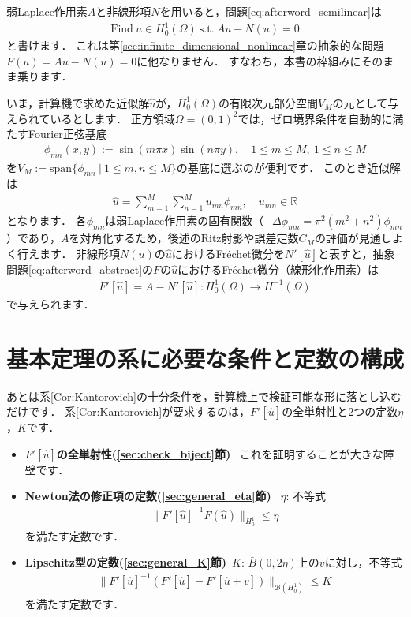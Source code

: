 弱Laplace作用素$A$と非線形項$N$を用いると，問題\eqref{eq:afterword_semilinear}は
\begin{align}
	\mbox{Find} ~ u \in H_0^1(\Omega) ~ \mbox{s.t.} ~ A u - N(u) = 0
	\label{eq:afterword_abstract}
\end{align}
と書けます．
これは第\ref{sec:infinite_dimensional_nonlinear}章の抽象的な問題$F(u) = Au - N(u) = 0$に他なりません．
すなわち，本書の枠組みにそのまま乗ります．

いま，計算機で求めた近似解$\hat{u}$が，$H_0^1(\Omega)$の有限次元部分空間$V_M$の元として与えられているとします．
正方領域$\Omega = (0,1)^2$では，ゼロ境界条件を自動的に満たすFourier正弦基底
\begin{align}
	\phi_{mn}(x, y) := \sin(m\pi x) \sin(n\pi y), \quad 1 \le m \le M,~ 1 \le n \le M
	\label{eq:afterword_basis}
\end{align}
を$V_M := \mathrm{span}\{ \phi_{mn} ~|~ 1 \le m, n \le M \}$の基底に選ぶのが便利です．
このとき近似解は
\begin{align}
	\hat{u} = \sum_{m=1}^{M} \sum_{n=1}^{M} u_{mn} \phi_{mn}, \quad u_{mn} \in \mathbb{R}
	\label{eq:afterword_uhat}
\end{align}
となります．
各$\phi_{mn}$は弱Laplace作用素の固有関数（$-\Delta \phi_{mn} = \pi^2(m^2 + n^2) \phi_{mn}$）であり，$A$を対角化するため，後述のRitz射影や誤差定数$C_M$の評価が見通しよく行えます．
非線形項$N(u)$の$\hat{u}$におけるFr\'echet微分を$N'[\hat{u}]$と表すと，抽象問題\eqref{eq:afterword_abstract}の$F$の$\hat{u}$におけるFr\'echet微分（線形化作用素）は
\begin{align}
	F'[\hat{u}] = A - N'[\hat{u}] : H_0^1(\Omega) \to H^{-1}(\Omega)
	\label{eq:afterword_L}
\end{align}
で与えられます．


\section*{基本定理の系に必要な条件と定数の構成}

あとは系\ref{Cor:Kantorovich}の十分条件を，計算機上で検証可能な形に落とし込むだけです．
系\ref{Cor:Kantorovich}が要求するのは，$F'[\hat{u}]$の全単射性と2つの定数$\eta$，$K$です．

\begin{itemize}
	\item \textbf{$F'[\hat{u}]$の全単射性(\ref{sec:check_biject}節)} ~これを証明することが大きな障壁です．
	\item \textbf{Newton法の修正項の定数(\ref{sec:general_eta}節)} ~$\eta$: 不等式
	\begin{align*}
		\| F'[\hat{u}]^{-1} F(\hat{u}) \|_{H_0^1} \le \eta
	\end{align*}
	を満たす定数です．
	\item \textbf{Lipschitz型の定数(\ref{sec:general_K}節)}~$K$: $\bar{B}(0, 2\eta)$上の$v$に対し，不等式
	\begin{align*}
		\| F'[\hat{u}]^{-1} \left( F'[\hat{u}] - F'[\hat{u} + v] \right) \|_{{\mathcal B}(H_0^1)} \le K
	\end{align*}
	を満たす定数です．
\end{itemize}

